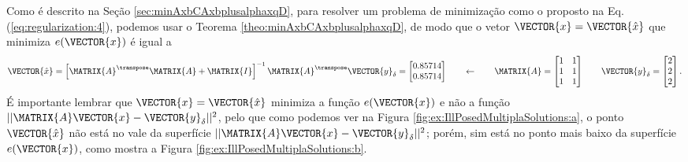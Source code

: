 \begin{SolutionT}
\label{sol:IllPosedMultiplaSolutions}
Como é descrito na Seção \ref{sec:minAxbCAxbplusalphaxqD}, 
para resolver um problema de minimização como o proposto na Eq. (\ref{eq:regularization:4}),
podemos usar o Teorema \ref{theo:minAxbCAxbplusalphaxqD}, 
de modo que o vetor $\VECTOR{x}=\VECTOR{\hat{x}}$ que minimiza $e(\VECTOR{x})$
é igual a
\begin{equation}\label{eq:regularization:4b}
\VECTOR{\hat{x}} =
\left[ \MATRIX{A}^{\transpose}\MATRIX{A} +\MATRIX{I}\right]^{-1} \MATRIX{A}^{\transpose} \VECTOR{y}_{\delta}
=
\begin{bmatrix}
0.85714\\
0.85714
\end{bmatrix}
\qquad \leftarrow \qquad
\MATRIX{A}=
\begin{bmatrix}
1 & 1\\
1 & 1\\
1 & 1
\end{bmatrix}
\qquad
\VECTOR{y}_{\delta}=
\begin{bmatrix}
2\\
2\\
2
\end{bmatrix}.
\end{equation}
É importante lembrar que $\VECTOR{x}=\VECTOR{\hat{x}}$ minimiza a função $e(\VECTOR{x})$ e não
a função $||\MATRIX{A}\VECTOR{x}-\VECTOR{y}_{\delta}||^2$,
pelo que como podemos ver na Figura \ref{fig:ex:IllPosedMultiplaSolutions:a},
o ponto $\VECTOR{\hat{x}}$ não está no vale da superfície $||\MATRIX{A}\VECTOR{x}-\VECTOR{y}_{\delta}||^2$;
porém, sim está no ponto mais baixo da superfície $e(\VECTOR{x})$, como mostra a Figura \ref{fig:ex:IllPosedMultiplaSolutions:b}.
\end{SolutionT}

